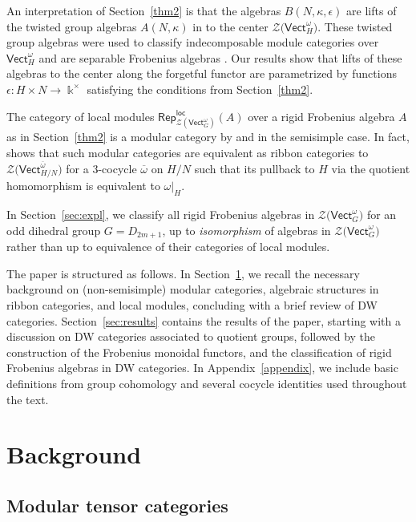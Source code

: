 \documentclass[pdftex]{sigma}
\numberwithin{equation}{section}
\newcommand{\ov}[1]{\overline{#1}}
\newcommand{\locmod}{\mathsf{Rep}^{\mathsf{loc}}}
\newcommand{\Vect}{\mathsf{Vect}}
\newcommand{\cZ}{\mathcal{Z}}
\begin{document}
An interpretation of Section~\ref{thm2} is that the algebras $B(N,\kappa,\epsilon)$ are lifts of the twisted group algebras $A(N,\kappa)$ in \smash{$\Vect_H^{\omega|_H}$} to the center $\cZ\big(\Vect_H^\omega\big)$. These twisted group algebras were used to classify indecomposable module categories over $\Vect_H^\omega$ \cite{Nat,Ost} and are separable Frobenius algebras \cite{WINART}.
Our results show that lifts of these algebras to the center along the forgetful functor are parametrized by functions $\epsilon\colon H\times N\to \Bbbk^\times$ satisfying the conditions from Section~\ref{thm2}.

The category of local modules $\locmod_{\cZ(\Vect_{G}^\omega)}(A)$ over a rigid Frobenius algebra $A$ as in Section~\ref{thm2} is a modular category by \cite[Theorem 4.12]{LW3} and \cite[Theorem~4.5]{KO} in the semisimple case. In fact, \cite[Theorem~3.16]{DS} shows that such modular categories are equivalent as ribbon categories to~$\cZ\big(\Vect_{H/N}^{\ov{\omega}}\big)$ for a $3$-cocycle $\ov{\omega}$ on $H/N$ such that its pullback to $H$ via the quotient homomorphism is equivalent to $\omega|_H$.

In Section~\ref{sec:expl}, we classify all rigid Frobenius algebras in $\cZ\big(\Vect_G^\omega\big)$ for an odd dihedral group $G=D_{2m+1}$, up to \emph{isomorphism} of algebras in $\cZ\big(\Vect_G^\omega\big)$ rather than up to equivalence of their categories of local modules.

The paper is structured as follows. In Section~\ref{sec:background}, we recall the necessary background on (non-semisimple) modular categories, algebraic structures in ribbon categories, and local modules, concluding with a brief review of DW categories. Section~\ref{sec:results} contains the results of the paper, starting with a discussion on DW categories associated to quotient groups, followed by the construction of the Frobenius monoidal functors, and the classification of rigid Frobenius algebras in DW categories. In Appendix~\ref{appendix}, we include basic definitions from group cohomology and several cocycle identities used throughout the text.

\section{Background}\label{sec:background}

\subsection{Modular tensor categories}
\end{document}

